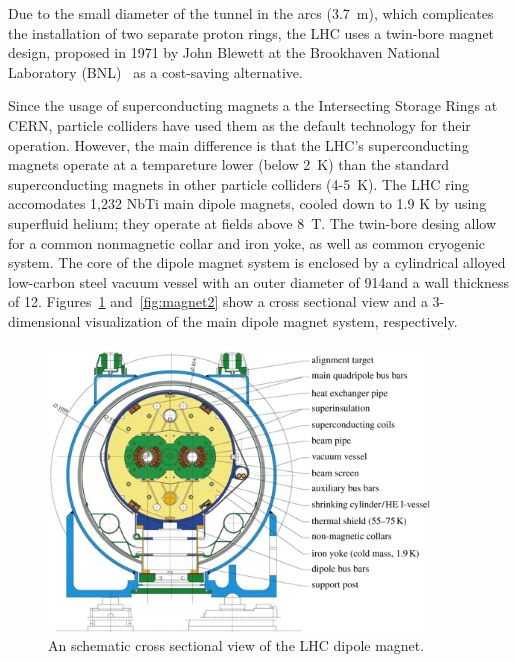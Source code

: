Due to the small diameter of the tunnel in the arcs
(3.7~m), which complicates the installation of two separate proton
rings, the LHC uses a twin-bore magnet design, proposed in 1971 by
John Blewett at the Brookhaven National Laboratory
(BNL)~\cite{JBlewett} as a cost-saving alternative. 

Since the usage of superconducting magnets a the Intersecting  Storage
Rings at CERN, particle colliders have used them as the default
technology for their operation. However, the main difference is that the LHC's
superconducting magnets operate at a tempareture lower (below 2~K) than the
standard superconducting magnets in other particle colliders
(4-5~K). The LHC ring accomodates 1,232 NbTi main dipole magnets,
cooled down to 1.9 K by using superfluid helium; they operate at fields
above 8~T. The twin-bore desing allow for a common nonmagnetic collar
and iron yoke, as well as common cryogenic system. The core of the
dipole magnet system is enclosed by a cylindrical alloyed low-carbon steel vacuum vessel with an outer diameter of 914\mm and a wall
thickness of 12\mm. Figures~\ref{fig:magnet1} and~\ref{fig:magnet2} show a cross sectional
view and a 3-dimensional visualization of the main dipole magnet
system, respectively.
\begin{figure}
 \centering
 \includegraphics[width=0.9\textwidth]{LHC_fig/ColdMassMagnet.jpg}
 \caption{An schematic cross sectional view of the LHC dipole magnet.\label{fig:magnet1} }
\end{figure}
